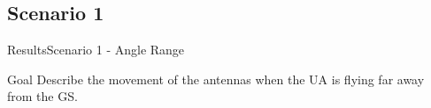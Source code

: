 \subsection{Scenario 1}

\begin{frame}{Results}{Scenario 1 - Angle Range}

  \begin{block}{Goal}
	Describe the movement of the antennas when the UA is flying far away from the GS. 
  \end{block}

  \begin{figure}[H]
    \centerline{
    \hfill
    }
  \end{figure}

\end{frame}



